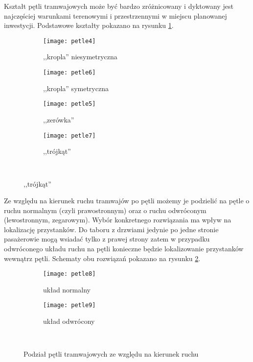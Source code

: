 \documentclass[twoside,12pt]{article}
\begin{document}
	Kształt pętli tramwajowych może być bardzo zróżnicowany i dyktowany jest najczęściej warunkami terenowymi i przestrzennymi w miejscu planowanej inwestycji. Podstawowe kształty pokazano na rysunku \ref{petle2}.
	
	\begin{figure}[H]
	\centering
	\caption{Podział pętli tramwajowych ze względu na kształt}
	\begin{subfigure}{.25\textwidth}
	  \centering
	  \texttt{[image: petle4]}
	  \caption{,,kropla'' niesymetryczna}
	\end{subfigure}%
	\begin{subfigure}{.25\textwidth}
	  \centering
	  \texttt{[image: petle6]}
	  \caption{,,kropla'' symetryczna}
	\end{subfigure}%
	\begin{subfigure}{.25\textwidth}
	  \centering
	  \texttt{[image: petle5]}
	  \caption{,,zerówka''}
	\end{subfigure}%
		\begin{subfigure}{.25\textwidth}
	  \centering
	  \texttt{[image: petle7]}
	  \caption{,,trójkąt''}
	\end{subfigure}
	\label{petle2}\\
	\end{figure}
	
	Ze względu na kierunek ruchu tramwajów po pętli możemy je podzielić na pętle o ruchu normalnym (czyli prawostronnym) oraz o ruchu odwróconym (lewostronnym, zegarowym). Wybór konkretnego rozwiązania ma wpływ na lokalizację przystanków. Do taboru z drzwiami jedynie po jedne stronie pasażerowie mogą wsiadać tylko z prawej strony zatem w przypadku odwróconego układu ruchu na pętli konieczne będzie lokalizowanie przystanków wewnątrz pętli. Schematy obu rozwiązań pokazano na rysunku \ref{petle3}.
	
	\begin{figure}[H]
	\centering
	\begin{subfigure}{.33\textwidth}
	  \centering
	  \texttt{[image: petle8]}
	  \caption{układ normalny}
	\end{subfigure}%
	\begin{subfigure}{.33\textwidth}
	  \centering
	  \texttt{[image: petle9]}
	  \caption{układ odwrócony}
	\end{subfigure}
	\label{petle3}\\
	\caption{Podział pętli tramwajowych ze względu na kierunek ruchu}
	\end{figure}
	
\end{document}
